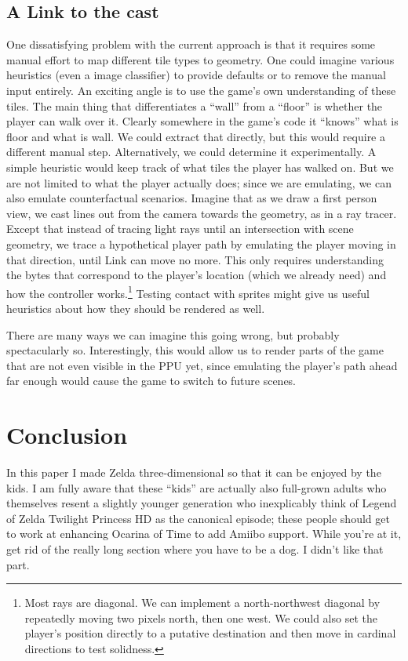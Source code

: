 \documentclass[twocolumn]{article}
\begin{document}
\subsection{A Link to the cast} \label{sec:cast}

One dissatisfying problem with the current approach is that it
requires some manual effort to map different tile types to geometry.
One could imagine various heuristics (even a image classifier) to
provide defaults or to remove the manual input entirely. An exciting
angle is to use the game's own understanding of these tiles. The main
thing that differentiates a ``wall'' from a ``floor'' is whether the
player can walk over it. Clearly somewhere in the game's code it
``knows'' what is floor and what is wall. We could extract that
directly, but this would require a different manual step.
Alternatively, we could determine it experimentally. A simple
heuristic would keep track of what tiles the player has walked on. But
we are not limited to what the player actually does; since we are
emulating, we can also emulate counterfactual scenarios. Imagine that
as we draw a first person view, we cast lines out from the camera
towards the geometry, as in a ray tracer. Except that instead of
tracing light rays until an intersection with scene geometry, we trace
a hypothetical player path by emulating the player moving in that
direction, until Link can move no more. This only requires
understanding the bytes that correspond to the player's location
(which we already need) and how the controller works.\footnote{Most
  rays are diagonal. We can implement a north-northwest diagonal by
  repeatedly moving two pixels north, then one west. We could also set
  the player's position directly to a putative destination and then
  move in cardinal directions to test solidness.} Testing contact with
sprites might give us useful heuristics about how they should be
rendered as well.

There are many ways we can imagine this going wrong, but probably
spectacularly so. Interestingly, this would allow us to render parts
of the game that are not even visible in the PPU yet, since emulating
the player's path ahead far enough would cause the game to switch
to future scenes.

\section{Conclusion}

In this paper I made Zelda three-dimensional so that it can be enjoyed
by the kids. I am fully aware that these ``kids'' are actually also
full-grown adults who themselves resent a slightly younger generation
who inexplicably think of Legend of Zelda Twilight Princess HD as the
canonical episode; these people should get to work at enhancing Ocarina
of Time to add Amiibo support. While you're at it, get rid of the
really long section where you have to be a dog. I didn't like that part.




\end{document}
